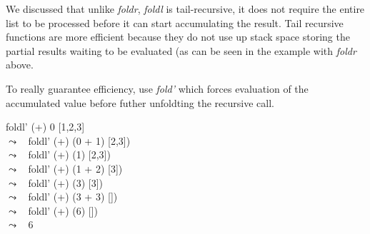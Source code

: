 \documentclass[11pt]{article}
\begin{document}





We discussed that unlike {\em{foldr}}, {\em{foldl}} is tail-recursive, it does
not require the entire list to be processed before it can start accumulating
the result.  Tail recursive functions are more efficient because they do not
use up stack space storing the partial results waiting to be evaluated (as can
be seen in the example with {\it{foldr}} above.

To really guarantee efficiency, use {\it{fold'}} which forces
evaluation of the accumulated value before futher unfoldting the
recursive call.


\begin{program**}
\> foldl' (+) 0  [1,2,3]\\
\> $\leadsto\;\;$ foldl' (+) (0 + 1) [2,3]) \\
\> $\leadsto\;\;$ foldl' (+) (1) [2,3]) \\
\> $\leadsto\;\;$ foldl' (+) (1 + 2) [3]) \\
\> $\leadsto\;\;$ foldl' (+) (3) [3]) \\
\> $\leadsto\;\;$ foldl' (+) (3 + 3) []) \\
\> $\leadsto\;\;$ foldl' (+) (6) []) \\
\> $\leadsto\;\;$ 6 \\
\end{program**}
\end{document}
